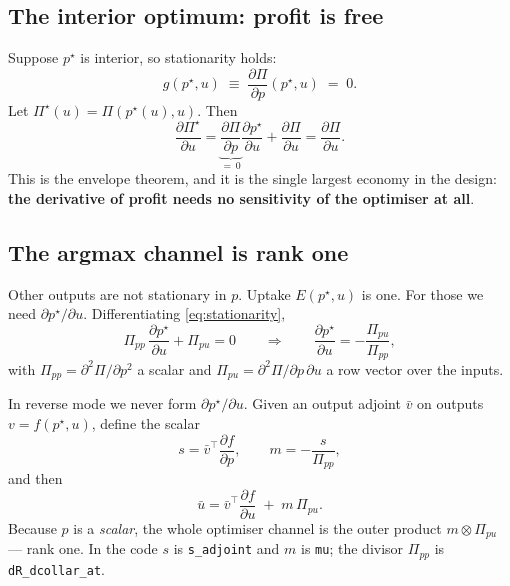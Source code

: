 \documentclass[11pt,a4paper]{article}
\newcommand{\code}[1]{\texttt{\small #1}}
\newcommand{\adj}[1]{\bar{#1}}
\newcommand{\dd}[2]{\frac{\partial #1}{\partial #2}}
\begin{document}
\subsection{The interior optimum: profit is free}

Suppose $p^\star$ is interior, so stationarity holds:
\begin{equation}
g(p^\star, u) \;\equiv\; \dd{\Pi}{p}(p^\star, u) \;=\; 0 .
\label{eq:stationarity}
\end{equation}
Let $\Pi^\star(u) = \Pi(p^\star(u), u)$. Then
\begin{equation}
\dd{\Pi^\star}{u}
= \underbrace{\dd{\Pi}{p}}_{=\,0} \dd{p^\star}{u} + \dd{\Pi}{u}
= \dd{\Pi}{u} .
\label{eq:envelope}
\end{equation}
This is the envelope theorem, and it is the single largest economy in the design:
\textbf{the derivative of profit needs no sensitivity of the optimiser at all}.

\subsection{The argmax channel is rank one}

Other outputs are not stationary in $p$. Uptake $E(p^\star, u)$ is one. For those
we need $\partial p^\star/\partial u$. Differentiating \eqref{eq:stationarity},
\begin{equation}
\Pi_{pp} \, \dd{p^\star}{u} + \Pi_{pu} = 0
\qquad\Longrightarrow\qquad
\dd{p^\star}{u} = -\frac{\Pi_{pu}}{\Pi_{pp}} ,
\label{eq:argmaxsens}
\end{equation}
with $\Pi_{pp} = \partial^2\Pi/\partial p^2$ a scalar and
$\Pi_{pu} = \partial^2 \Pi/\partial p \, \partial u$ a row vector over the inputs.

In reverse mode we never form $\partial p^\star/\partial u$. Given an output
adjoint $\adj v$ on outputs $v = f(p^\star, u)$, define the scalar
\begin{equation}
s = \adj{v}^{\!\top} \dd{f}{p},
\qquad
m = -\frac{s}{\Pi_{pp}} ,
\label{eq:mu}
\end{equation}
and then
\begin{equation}
\adj u = \adj{v}^{\!\top}\dd{f}{u} \;+\; m \, \Pi_{pu}.
\label{eq:argmaxadj}
\end{equation}
Because $p$ is a \emph{scalar}, the whole optimiser channel is the outer product
$m \otimes \Pi_{pu}$ --- rank one. In the code $s$ is \code{s\_adjoint} and $m$ is
\code{mu}; the divisor $\Pi_{pp}$ is \code{dR\_dcollar\_at}.
\end{document}
